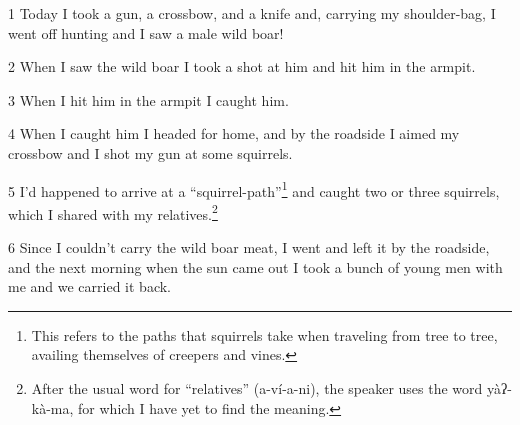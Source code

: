 
1 Today I took a gun, a crossbow, and a knife and, carrying my shoulder-bag, I
went off hunting and I saw a male wild boar!

2 When I saw the wild boar I took a shot at him and hit him in the armpit.

3 When I hit him in the armpit I caught him.

4 When I caught him I headed for home, and by the roadside I aimed my crossbow
and I shot my gun at some squirrels.

5 I'd happened to arrive at a ``squirrel-path''\footnote{This refers to the paths that squirrels take when traveling from tree to tree, availing themselves of creepers and vines.} and caught two or three squirrels,
which I shared with my relatives.\footnote{After the usual word for ``relatives'' (a-ví-a-ni), the speaker uses the word yàʔ-kà-ma, for which I have yet to find the meaning.}

6 Since I couldn't carry the wild boar meat, I went and left it by the roadside,
and the next morning when the sun came out I took a bunch of young men with me
and we carried it back.

